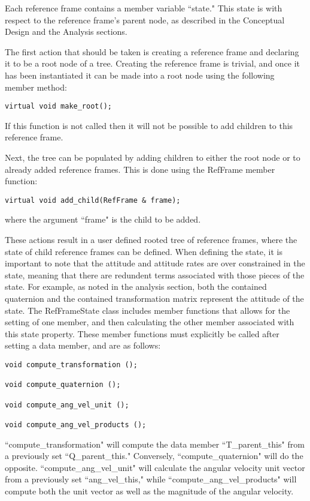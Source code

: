 Each reference frame contains a member variable ``state." This state is with
respect to the reference frame's parent node, as described in the
Conceptual Design and the Analysis sections.

The first action that should be taken is creating a reference frame and
declaring it to be a root node of a tree. Creating the reference frame is
trivial, and once it has been instantiated it can be made into
a root node using the following member method:

\begin{verbatim}
virtual void make_root();
\end{verbatim}

If this function is not called then it will not be possible to add children
to this reference frame.

Next, the tree can be populated by adding children to either the root node
or to already added reference frames. This is done using the RefFrame member
function:

\begin{verbatim}
virtual void add_child(RefFrame & frame);
\end{verbatim}

where the argument ``frame" is the child to be added.

These actions result in a user
defined rooted tree of reference frames, where the state of child reference
frames can be defined. When defining the state, it is important to note
that the attitude and attitude rates are over constrained in the state, meaning
that there are redundent terms associated with those pieces of the state.
For example, as noted in the analysis section, both the contained
quaternion and the contained transformation matrix represent the attitude
of the state. The RefFrameState class includes member functions that allows
for the setting of one member, and then calculating the other member
associated with this state property. These member functions must explicitly
be called after setting a data member, and are as follows:

\begin{verbatim}
void compute_transformation ();

void compute_quaternion ();

void compute_ang_vel_unit ();

void compute_ang_vel_products ();
\end{verbatim}

``compute\_transformation" will compute the data member ``T\_parent\_this" from
a previously set ``Q\_parent\_this." Conversely, ``compute\_quaternion" will do
the opposite. ``compute\_ang\_vel\_unit" will calculate the
angular velocity unit vector from a previously set ``ang\_vel\_this," while
``compute\_ang\_vel\_products" will compute both the unit vector as well
as the magnitude of the angular velocity.

